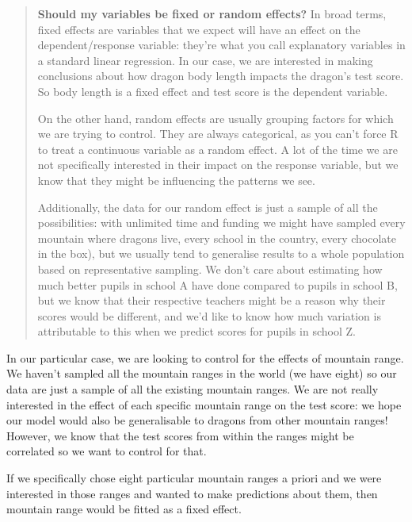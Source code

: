 \documentclass[
]{article}
\begin{document}
\begin{quote}
\textbf{Should my variables be fixed or random effects?} In broad terms,
fixed effects are variables that we expect will have an effect on the
dependent/response variable: they're what you call explanatory variables
in a standard linear regression. In our case, we are interested in
making conclusions about how dragon body length impacts the dragon's
test score. So body length is a fixed effect and test score is the
dependent variable.

On the other hand, random effects are usually grouping factors for which
we are trying to control. They are always categorical, as you can't
force R to treat a continuous variable as a random effect. A lot of the
time we are not specifically interested in their impact on the response
variable, but we know that they might be influencing the patterns we
see.

Additionally, the data for our random effect is just a sample of all the
possibilities: with unlimited time and funding we might have sampled
every mountain where dragons live, every school in the country, every
chocolate in the box), but we usually tend to generalise results to a
whole population based on representative sampling. We don't care about
estimating how much better pupils in school A have done compared to
pupils in school B, but we know that their respective teachers might be
a reason why their scores would be different, and we'd like to know how
much variation is attributable to this when we predict scores for pupils
in school Z.
\end{quote}

In our particular case, we are looking to control for the effects of
mountain range. We haven't sampled all the mountain ranges in the world
(we have eight) so our data are just a sample of all the existing
mountain ranges. We are not really interested in the effect of each
specific mountain range on the test score: we hope our model would also
be generalisable to dragons from other mountain ranges! However, we know
that the test scores from within the ranges might be correlated so we
want to control for that.

If we specifically chose eight particular mountain ranges a priori and
we were interested in those ranges and wanted to make predictions about
them, then mountain range would be fitted as a fixed effect.
\end{document}
